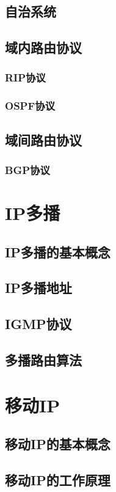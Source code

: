 \documentclass[lang=cn,newtx,10pt,scheme=chinese]{../../elegantbook}
\begin{document}
\subsection{自治系统}
\subsection{域内路由协议}
\subsubsection{RIP协议}
\subsubsection{OSPF协议}
\subsection{域间路由协议}
\subsubsection{BGP协议}

\section{IP多播}
\subsection{IP多播的基本概念}
\subsection{IP多播地址}
\subsection{IGMP协议}
\subsection{多播路由算法}

\section{移动IP}
\subsection{移动IP的基本概念}
\subsection{移动IP的工作原理}
\end{document}
